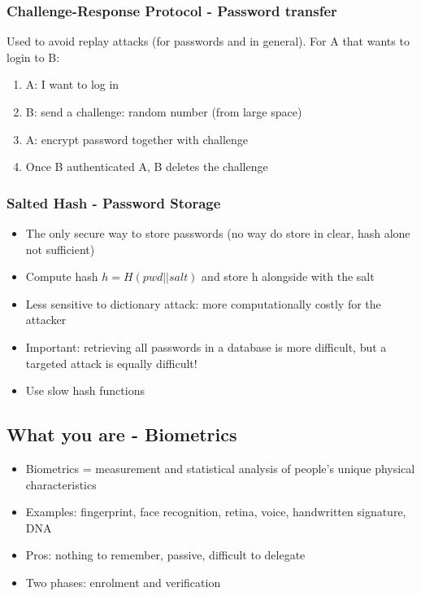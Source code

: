 \documentclass{article}
\newenvironment{myitemize}
{ \begin{itemize}
    \setlength{\itemsep}{005pt}
    \setlength{\parskip}{0pt}
    \setlength{\parsep}{0pt}     }
{ \end{itemize}                  }
\begin{document}
\begin{multicols}{2}
\subsubsection{Challenge-Response Protocol - Password transfer}

Used to avoid replay attacks (for passwords and in general). For A that wants to login to B:

\begin{enumerate}
    \item A: I want to log in
    \item B: send a challenge: random number (from large space)
    \item A: encrypt password together with challenge
    \item Once B authenticated A, B deletes the challenge
\end{enumerate}

\subsubsection{Salted Hash - Password Storage}

\begin{myitemize}
    \item The only secure way to store passwords (no way do store in clear, hash alone not sufficient)
    \item Compute hash $h=H(pwd||salt)$ and store h alongside with the salt
    \item Less sensitive to dictionary attack: more computationally costly for the attacker
    \item Important: retrieving all passwords in a database is more difficult, but a targeted attack is equally difficult!
    \item Use slow hash functions
\end{myitemize}


\subsection{What you are - Biometrics}

\begin{itemize}
    \item Biometrics = measurement and statistical analysis of people's unique physical characteristics
    \item Examples: fingerprint, face recognition, retina, voice, handwritten signature, DNA
    \item Pros: nothing to remember, passive, difficult to delegate
    \item Two phases: enrolment and verification
\end{itemize}


\end{multicols}
\end{document}
